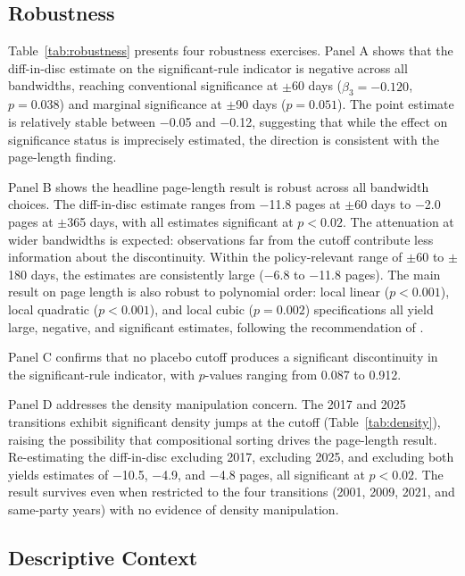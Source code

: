 \documentclass[12pt]{article}
\begin{document}
\subsection{Robustness}



Table~\ref{tab:robustness} presents four robustness exercises. Panel A shows that the diff-in-disc estimate on the significant-rule indicator is negative across all bandwidths, reaching conventional significance at $\pm$60 days ($\hat{\beta}_3 = -0.120$, $p = 0.038$) and marginal significance at $\pm$90 days ($p = 0.051$). The point estimate is relatively stable between $-$0.05 and $-$0.12, suggesting that while the effect on significance status is imprecisely estimated, the direction is consistent with the page-length finding.

Panel B shows the headline page-length result is robust across all bandwidth choices. The diff-in-disc estimate ranges from $-$11.8 pages at $\pm$60 days to $-$2.0 pages at $\pm$365 days, with all estimates significant at $p < 0.02$. The attenuation at wider bandwidths is expected: observations far from the cutoff contribute less information about the discontinuity. Within the policy-relevant range of $\pm$60 to $\pm$180 days, the estimates are consistently large ($-$6.8 to $-$11.8 pages). The main result on page length is also robust to polynomial order: local linear ($p < 0.001$), local quadratic ($p < 0.001$), and local cubic ($p = 0.002$) specifications all yield large, negative, and significant estimates, following the recommendation of \citet{gelman2019}.

Panel C confirms that no placebo cutoff produces a significant discontinuity in the significant-rule indicator, with $p$-values ranging from 0.087 to 0.912.

Panel D addresses the density manipulation concern. The 2017 and 2025 transitions exhibit significant density jumps at the cutoff (Table~\ref{tab:density}), raising the possibility that compositional sorting drives the page-length result. Re-estimating the diff-in-disc excluding 2017, excluding 2025, and excluding both yields estimates of $-$10.5, $-$4.9, and $-$4.8 pages, all significant at $p < 0.02$. The result survives even when restricted to the four transitions (2001, 2009, 2021, and same-party years) with no evidence of density manipulation.

\subsection{Descriptive Context}
\end{document}
